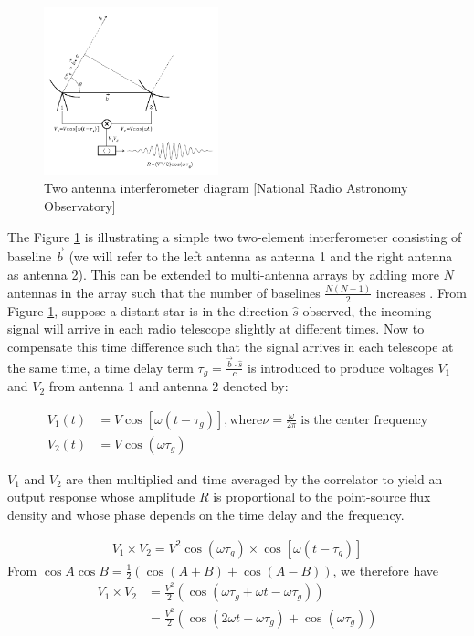 \begin{figure}[h!]
  \centering
    \includegraphics[width=0.45\textwidth]{images/Rint.png}
    \caption{Two antenna interferometer diagram [National Radio Astronomy Observatory]}
  \label{images/Rint.png}
\end{figure}

The Figure \ref{images/Rint.png} is illustrating a simple two two-element interferometer consisting of baseline $\overrightarrow{b}$ (we will refer to the left antenna as antenna 1 and the right antenna as antenna 2). This can be extended to multi-antenna arrays by adding more $N$ antennas in the array such that the number of baselines  $\frac{N(N-1)}{2}$  increases \citep{zensus1995very}. From Figure \ref{images/Rint.png}, suppose a distant star is in the direction $\widehat{s}$ observed, the incoming signal will arrive in each radio telescope slightly at different times. Now to compensate this time difference such that the signal arrives in each telescope at the same time, a time delay term $\tau_{g}=\frac{\overrightarrow{b}\cdot\widehat{s}}{c}$ is introduced to produce voltages $V_1$ and $V_2$ from antenna 1 and antenna 2 denoted by: 

\begin{equation}\label{eq111}
\begin{split}
V_1(t)&=V\cos[\omega(t-\tau_{g})], \text{where} \nu=\frac{\omega}{2\pi}\; \text{is the center frequency} \\
V_2(t)&=V\cos(\omega\tau_{g})
\end{split}
\end{equation}

$V_1$ and $V_2$ are then  multiplied and time averaged by the correlator to yield an output response whose amplitude $R$ is proportional to the point-source flux density and whose phase depends on the time delay and the frequency.

\begin{align}
V_1 \times V_2 = V^2 \cos(\omega\tau_{g})\times \cos[\omega(t-\tau_{g})]
\end{align}
From $\cos A\cos B= \frac{1}{2} \left(\cos (A+B) + \cos (A-B) \right)$, 
we therefore have 
\begin{align*}
V_1 \times V_2&= \frac{V^2}{2} \left( \cos(\omega\tau_{g} + \omega t-\omega \tau_{g} )\right)\\
&= \frac{V^2}{2} \left(\cos(2\omega t - \omega \tau_{g}) + \cos (\omega\tau_{g})\right)
\end{align*}

